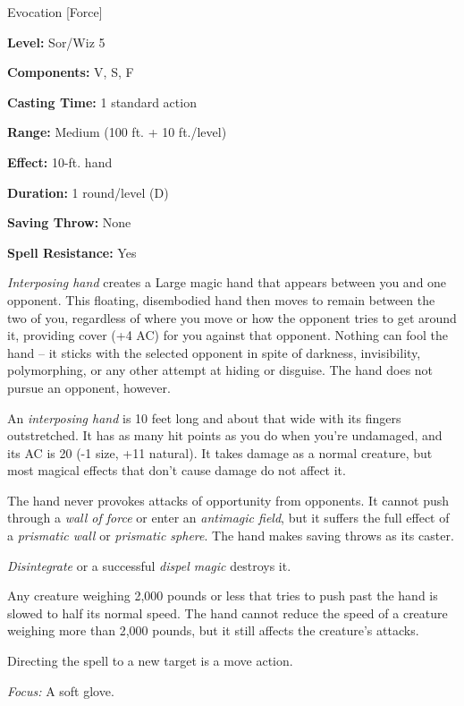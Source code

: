 
Evocation [Force]

\textbf{Level:} Sor/Wiz 5

\textbf{Components:} V, S, F

\textbf{Casting Time:} 1 standard action

\textbf{Range:} Medium (100 ft. + 10 ft./level)

\textbf{Effect:} 10-ft. hand

\textbf{Duration:} 1 round/level (D)

\textbf{Saving Throw:} None

\textbf{Spell Resistance:} Yes

\textit{Interposing hand} creates a Large magic hand that appears between you and 
one opponent. This floating, disembodied hand then moves to remain between the 
two of you, regardless of where you move or how the opponent tries to get around 
it, providing cover (+4 AC) for you against that opponent. Nothing can fool the 
hand -- it sticks with the selected opponent in spite of darkness, invisibility, 
polymorphing, or any other attempt at hiding or disguise. The hand does not pursue 
an opponent, however.

An \textit{interposing hand} is 10 feet long and about that wide with its fingers 
outstretched. It has as many hit points as you do when you're undamaged, and its 
AC is 20 (-1 size, +11 natural). It takes damage as a normal creature, but most 
magical effects that don't cause damage do not affect it.

The hand never provokes attacks of opportunity from opponents. It cannot push through 
a \textit{wall of force} or enter an \textit{antimagic field}, but it suffers the 
full effect of a \textit{prismatic wall} or \textit{prismatic sphere}. The hand 
makes saving throws as its caster.

\textit{Disintegrate} or a successful \textit{dispel magic} destroys it.

Any creature weighing 2,000 pounds or less that tries to push past the hand is 
slowed to half its normal speed. The hand cannot reduce the speed of a creature 
weighing more than 2,000 pounds, but it still affects the creature's attacks.

Directing the spell to a new target is a move action.

\textit{Focus:} A soft glove.

